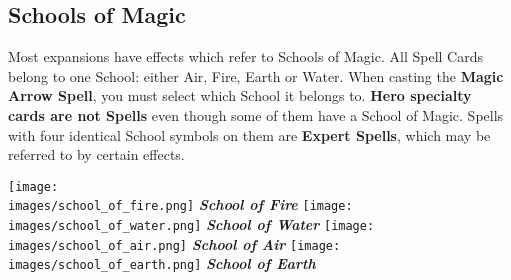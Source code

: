 
\begin{multicols}{2}

\subsection*{Schools of Magic}
Most expansions have effects which refer to Schools of Magic.
All Spell Cards belong to one School: either Air, Fire, Earth or Water.
When casting the \textbf{Magic Arrow Spell}, you must select which School it belongs to.
\textbf{Hero specialty cards are not Spells} even though some of them have a School of Magic.
Spells with four identical School symbols on them are \textbf{Expert Spells}, which may be referred to by certain effects.
\vspace*{\fill}

\columnbreak

\begin{minipage}[t]{0.48\textwidth}
  \centering
    \centering
    \texttt{[image: \\images/school\_of\_fire.png]}
    \textit{\textbf{\textcolor{darkcandyapplered}{School of Fire}}}
  \endminipage
    \centering
    \texttt{[image: \\images/school\_of\_water.png]}
    \textit{\textbf{\textcolor{darkcandyapplered}{School of Water}}}
  \endminipage
  \hfill\allowbreak%
  \bigbreak
    \centering
    \texttt{[image: \\images/school\_of\_air.png]}
    \textit{\textbf{\textcolor{darkcandyapplered}{School of Air}}}
  \endminipage
    \centering
    \texttt{[image: \\images/school\_of\_earth.png]}
    \textit{\textbf{\textcolor{darkcandyapplered}{School of Earth}}}
  \endminipage
  \bigbreak
\end{minipage}

\end{multicols}

